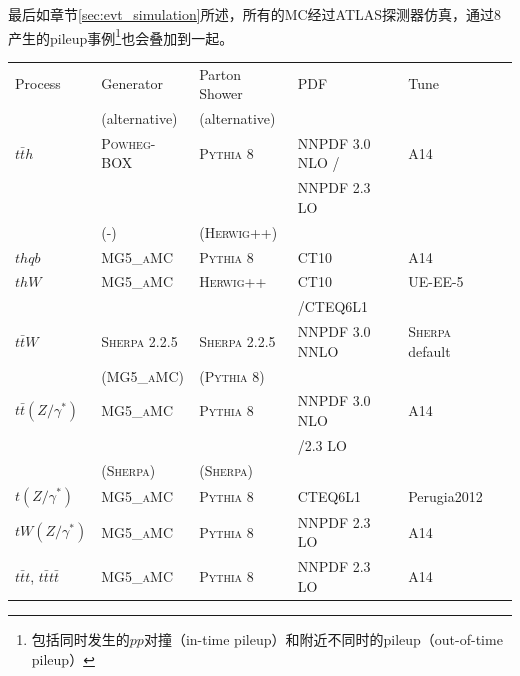 最后如章节\ref{sec:evt_simulation}所述，所有的MC经过ATLAS探测器仿真，通过\PYTHIA 8产生的pileup事例\footnote{包括同时发生的$pp$对撞（in-time pileup）和附近不同时的pileup（out-of-time pileup）}也会叠加到一起。%

\begin{table}
\begin{center}
{\small
\setlength\tabcolsep{1.5pt}
\begin{tabular}{llllll}
\hline\hline
Process & Generator & Parton Shower & PDF & Tune  \\
& (alternative) & (alternative) & & \\
\hline
$t\bar{t}h$ & \textsc{Powheg-BOX} \cite{powhegtt}  & \textsc{Pythia} 8\ & NNPDF 3.0 NLO \cite{Ball:2014uwa}/ & A14 \\
     &                                         &                                       & NNPDF 2.3 LO \cite{Ball:2012cx} \\
     & (-) & (\textsc{Herwig++}) &  \\
$thqb$ & \textsc{MG5\_aMC} & \textsc{Pythia} 8 & CT10 \cite{ct10} & A14  & \\
$thW$ & \textsc{MG5\_aMC} & \textsc{Herwig++}  & CT10 & UE-EE-5   \cite{Seymour:2013qka}   \\
& & & /CTEQ6L1 \cite{cteq6l1,cteq6}  \\
$t\bar{t}W$ & \textsc{Sherpa 2.2.5}~\cite{sherpa} & \textsc{Sherpa 2.2.5}  & NNPDF 3.0 NNLO  & \textsc{Sherpa} default   \\
& (\textsc{MG5\_aMC}) & (\textsc{Pythia} 8) &  \\
$t\bar{t} (Z/\gamma^*)$ & \textsc{MG5\_aMC} & \textsc{Pythia} 8 & NNPDF 3.0 NLO & A14  \\
&&& /2.3 LO \\
& (\textsc{Sherpa}) & (\textsc{Sherpa}) &  \\
$t (Z/\gamma^*)$ & \textsc{MG5\_aMC} & \textsc{Pythia} 8  & CTEQ6L1 & Perugia2012 \cite{perugia}  \\
$t W (Z/\gamma^*)$ & \textsc{MG5\_aMC} & \textsc{Pythia} 8 & NNPDF 2.3 LO  & A14  \\
$t\bar t t$, $t\bar t t\bar t$ & \textsc{MG5\_aMC} & \textsc{Pythia} 8 & NNPDF 2.3 LO & A14 \\

\end{tabular}}
\end{center}
\end{table}
